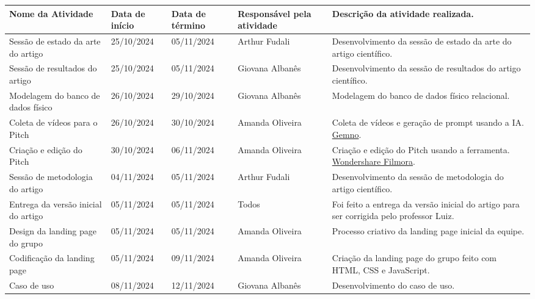 \documentclass[
landscape,
  a4paper,%
  12pt,%
  english,%
  brazilian,%
]{article}
\begin{document}
\break

\begin{table}[]
\begin{tabular}{|l|l|l|p{5cm}|p{8cm}|}
\hline
Nome da Atividade                     & Data de início  & Data de término & Responsável pela atividade  & Descrição da atividade realizada. \\ \hline
Sessão de estado da arte do artigo    & 25/10/2024      & 05/11/2024      & Arthur Fudali               & Desenvolvimento da sessão de estado da arte do artigo científico. \\ \hline
Sessão de resultados do artigo        & 25/10/2024      & 05/11/2024      & Giovana Albanês             & Desenvolvimento da sessão de resultados do artigo científico. \\ \hline
Modelagem do banco de dados físico    & 26/10/2024      & 29/10/2024      & Giovana Albanês             & Modelagem do banco de dados físico relacional. \\ \hline
Coleta de vídeos para o Pitch         & 26/10/2024      & 30/10/2024      & Amanda Oliveira             & Coleta de vídeos e geração de prompt usando a IA. \href{https://www.genmo.ai/}{Gemno}. \\ \hline
Criação e edição do Pitch             & 30/10/2024      & 06/11/2024      & Amanda Oliveira             & Criação e edição do Pitch usando a ferramenta. \href{https://filmora.wondershare.net}{Wondershare Filmora}. \\ \hline
Sessão de metodologia do artigo       & 04/11/2024      & 05/11/2024      & Arthur Fudali               & Desenvolvimento da sessão de metodologia do artigo científico. \\ \hline
Entrega da versão inicial do artigo   & 05/11/2024      & 05/11/2024      & Todos                       & Foi feito a entrega da versão inicial do artigo para ser corrigida pelo professor Luiz. \\ \hline
Design da landing page do grupo       & 05/11/2024      & 05/11/2024      & Amanda Oliveira             & Processo criativo da landing page inicial da equipe. \\ \hline
Codificação da landing page           & 05/11/2024      & 09/11/2024      & Amanda Oliveira             & Criação da landing page do grupo feito com HTML, CSS e JavaScript. \\ \hline
Caso de uso                           & 08/11/2024      & 12/11/2024      & Giovana Albanês             & Desenvolvimento do caso de uso. \\ \hline

\end{tabular}
\end{table}
\end{document}
